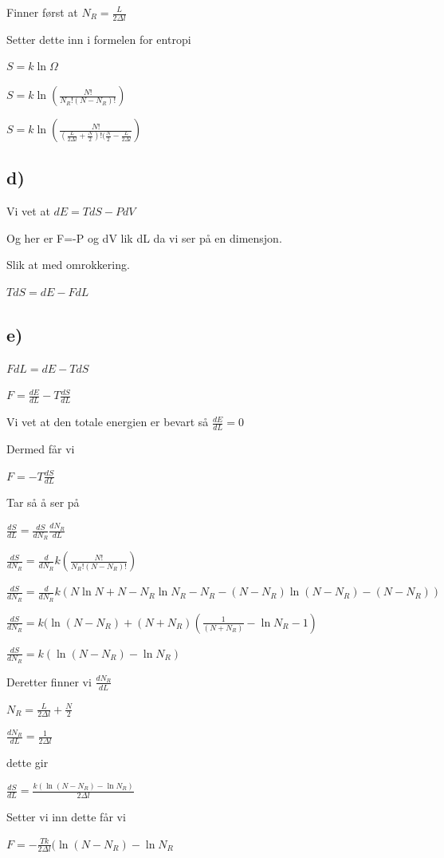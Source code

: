 \documentclass[12pt]{article}
\begin{document}
Finner først at $N_R = \frac{L}{2\Delta l}$

Setter dette inn i formelen for entropi

$S = k \ln \Omega$

$S = k\ln (\frac{N!}{N_R!(N-N_R)!})$

$S = k \ln (\frac{N!}{(\frac{L}{2\Delta l} +\frac{N}{2})!(\frac{N}{2}-\frac{L}{2\Delta l}})$

\subsection*{d)}

Vi vet at $dE = TdS -PdV$

Og her er F=-P og dV lik dL da vi ser på en dimensjon. 

Slik at med omrokkering.

$TdS = dE -FdL$

\subsection*{e)}

$FdL = dE -TdS$

$F = \frac{dE}{dL} -T\frac{dS}{dL}$

Vi vet at den totale energien er bevart så $\frac{dE}{dL} = 0$

Dermed får vi 

$F = -T\frac{dS}{dL}$

Tar så å ser på 

$\frac{dS}{dL} = \frac{dS}{dN_R}\frac{dN_R}{dL}$

$\frac{dS}{dN_R} = \frac{d}{dN_R} k(\frac{N!}{N_R!(N-N_R)!})$

$\frac{dS}{dN_R} = \frac{d}{dN_R} k (N\ln N +N -N_R\ln N_R -N_R -(N-N_R)\ln (N-N_R) -(N-N_R))$

$\frac{dS}{dN_R} = k(\ln (N-N_R) +(N+N_R)(\frac{1}{(N+N_R)}-\ln N_R -1)$

$\frac{dS}{dN_R} = k(\ln(N-N_R) -\ln N_R)$

Deretter finner vi $\frac{dN_R}{dL}$

$N_R = \frac{L}{2\Delta l} + \frac{N}{2}$

$\frac{dN_R}{dL} = \frac{1}{2\Delta l}$

dette gir

$\frac{dS}{dL} = \frac{k (\ln (N-N_R) -\ln N_R)}{2\Delta l}$

Setter vi inn dette får vi

$ F = -\frac{Tk}{2\Delta l}(\ln(N-N_R) -\ln N_R$
\end{document}
